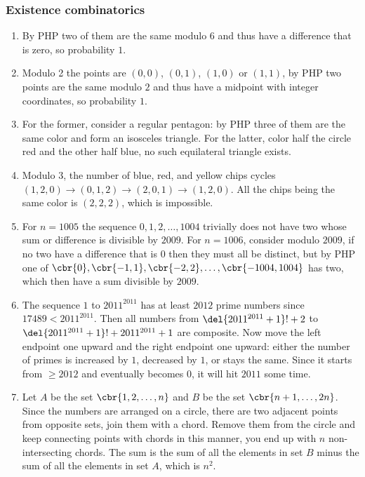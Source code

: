 \documentclass[10pt,paper=letter]{scrartcl}
\begin{document}
\subsubsection*{Existence combinatorics}

\begin{enumerate}

\item By PHP two of them are the same modulo $6$ and thus have a difference that is zero, so probability $1$.

\item Modulo 2 the points are $(0, 0)$, $(0, 1)$, $(1, 0)$ or $(1, 1)$, by PHP two points are the same modulo $2$ and thus have a midpoint with integer coordinates, so probability $1$.

\item For the former, consider a regular pentagon: by PHP three of them are the same color and form an isosceles triangle. For the latter, color half the circle red and the other half blue, no such equilateral triangle exists.

\item Modulo 3, the number of blue, red, and yellow chips cycles $(1, 2, 0) \to (0, 1, 2) \to (2, 0, 1) \to (1, 2, 0)$. All the chips being the same color is $(2, 2, 2)$, which is impossible.

\item For $n = 1005$ the sequence $0, 1, 2, \ldots, 1004$ trivially does not have two whose sum or difference is divisible by $2009$. For $n = 1006$, consider modulo $2009$, if no two have a difference that is $0$ then they must all be distinct, but by PHP one of $\cbr{0}, \cbr{-1, 1}, \cbr{-2, 2}, \ldots, \cbr{-1004, 1004}$ has two, which then have a sum divisible by $2009$.

\item The sequence $1$ to $2011^{2011}$ has at least $2012$ prime numbers since $17489 < 2011^{2011}$. Then all numbers from $\del{2011^{2011} + 1}! + 2$ to $\del{2011^{2011} + 1}! + 2011^{2011} + 1$ are composite. Now move the left endpoint one upward and the right endpoint one upward: either the number of primes is increased by $1$, decreased by $1$, or stays the same. Since it starts from $\geq2012$ and eventually becomes $0$, it will hit $2011$ some time.

\item Let $A$ be the set $\cbr{1, 2, \ldots, n}$ and $B$ be the set $\cbr{n+1, \ldots, 2n}$. Since the numbers are arranged on a circle, there are two adjacent points from opposite sets, join them with a chord. Remove them from the circle and keep connecting points with chords in this manner, you end up with $n$ non-intersecting chords. The sum is the sum of all the elements in set $B$ minus the sum of all the elements in set $A$, which is $n^2$.


\end{enumerate}
\end{document}
